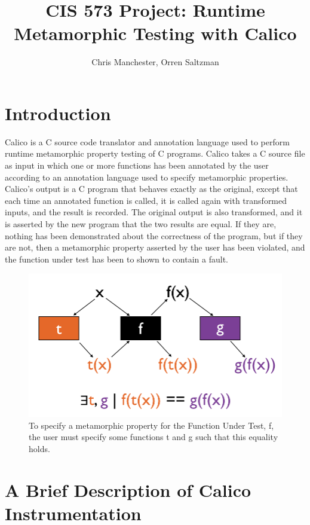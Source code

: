 \documentclass[notitlepage]{article}
\author{Chris Manchester, Orren Saltzman}
\title{CIS 573 Project: Runtime Metamorphic Testing with Calico}
\begin{document}
\maketitle

\section{Introduction}

Calico is a C source code translator and annotation language used to perform runtime metamorphic property testing of C programs. Calico takes a C source file as input in which one or more functions has been annotated by the user according to an annotation language used to specify metamorphic properties. Calico's output is a C program that behaves exactly as the original, except that each time an annotated function is called, it is called again with transformed inputs, and the result is recorded. The original output is also transformed, and it is asserted by the new program that the two results are equal. If they are, nothing has been demonstrated about the correctness of the program, but if they are not, then a metamorphic property asserted by the user has been violated, and the function under test has been to shown to contain a fault.

\begin{figure}[ht!]
\centering
\includegraphics[width=175mm]{calico_pic1_alternate.png}
\caption{To specify a metamorphic property for the Function Under Test, f, the user must specify some functions t and g such that this equality holds.}
\end{figure}

\section{A Brief Description of Calico Instrumentation}
\end{document}
